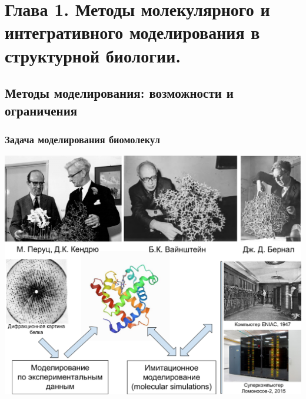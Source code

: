 
\section[Глава 1]{Глава 1. Методы молекулярного и интегративного модели­рования в структурной биологии.}
\subsection{Методы моделирования: возможности и ограничения}

\begin{frame}%
\frametitle{Задача моделирования биомолекул}
\centering
\includegraphics[height=0.85\textheight]{Presentation/images/s1} %

\end{frame}
